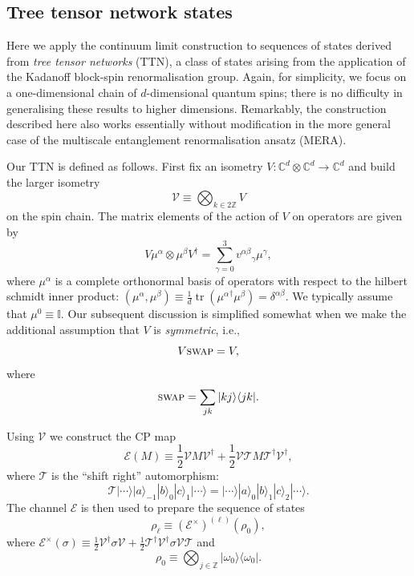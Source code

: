 \documentclass[prl,twocolumn,lengthcheck,superscriptaddress]{revtex4-1}
\newcommand{\tr}{\operatorname{tr}}
\theoremstyle{definition}
\theoremstyle{remark}
\begin{document}
\subsection{Tree tensor network states}
Here we apply the continuum limit construction to sequences of states derived from \emph{tree tensor networks} (TTN), a class of states arising from the application of the Kadanoff block-spin renormalisation group. Again, for simplicity, we focus on a one-dimensional chain of $d$-dimensional quantum spins; there is no difficulty in generalising these results to higher dimensions. Remarkably, the construction described here also works essentially without modification in the more general case of the multiscale entanglement renormalisation ansatz (MERA). 

Our TTN is defined as follows. First fix an isometry $V:\mathbb{C}^d\otimes \mathbb{C}^d \rightarrow \mathbb{C}^d$ and build the larger isometry
\begin{equation}
	\mathcal{V} \equiv \bigotimes_{k\in 2\mathbb{Z}} V
\end{equation}
on the spin chain.
The matrix elements of the action of $V$ on operators are given by
\begin{equation}
	V\mu^{\alpha}\otimes\mu^{\beta} V^\dag = \sum_{\gamma = 0}^3 {v^{\alpha\beta}}_{\gamma} \mu^\gamma,
\end{equation}
where $\mu^\alpha$ is a complete orthonormal basis of operators with respect to the hilbert schmidt inner product: $(\mu^\alpha, \mu^\beta) \equiv \frac1d\tr({\mu^\alpha}^\dag \mu^\beta) = \delta^{\alpha\beta}$. We typically assume that $\mu^0 \equiv \mathbb{I}$.
Our subsequent discussion is simplified somewhat when we make the additional assumption that $V$ is \emph{symmetric}, i.e., 
\begin{equation}
	V\textsc{swap} = V,
\end{equation}
where
\begin{equation}
	\textsc{swap} = \sum_{jk} |kj\rangle\langle jk|.
\end{equation}

Using $\mathcal{V}$ we construct the CP map
\begin{equation}
	\mathcal{E}(M) \equiv \frac12 \mathcal{V}M\mathcal{V}^\dag + \frac12 \mathcal{V}\mathcal{T}M\mathcal{T}^\dag\mathcal{V}^\dag,
\end{equation}
where $\mathcal{T}$ is the ``shift right'' automorphism:
\begin{equation}
	\mathcal{T}|\cdots \rangle |a\rangle_{-1} |b\rangle_{0} |c\rangle_{1} |\cdots \rangle = |\cdots \rangle |a\rangle_{0} |b\rangle_{1} |c\rangle_{2} |\cdots \rangle.
\end{equation}
The channel $\mathcal{E}$ is then used to prepare the sequence of states
\begin{equation}
	\rho_{\ell} \equiv (\mathcal{E}^\times)^{(\ell)}(\rho_0),
\end{equation}
where $\mathcal{E}^\times(\sigma)  \equiv \frac12 \mathcal{V}^\dag\sigma\mathcal{V} + \frac12 \mathcal{T}^\dag\mathcal{V}^\dag\sigma\mathcal{V}\mathcal{T}$ and 
\begin{equation}
	\rho_0 \equiv \bigotimes_{j\in\mathbb{Z}} |\omega_0\rangle\langle\omega_0|.
\end{equation}
\end{document}
